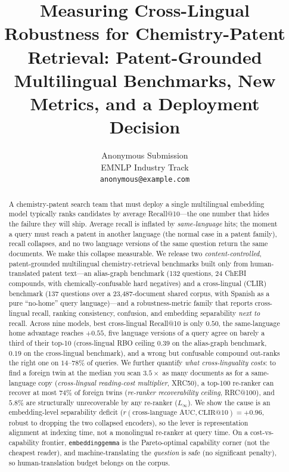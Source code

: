 \documentclass[11pt]{article}
\title{Measuring Cross-Lingual Robustness for Chemistry-Patent Retrieval:
Patent-Grounded Multilingual Benchmarks, New Metrics, and a Deployment Decision}
\author{Anonymous Submission \\
  EMNLP Industry Track \\
  \texttt{anonymous@example.com}}
\begin{document}
\maketitle

\begin{abstract}
A chemistry-patent search team that must deploy a single multilingual
embedding model typically ranks candidates by average Recall@10---the one
number that hides the failure they will ship. Average recall is inflated by
\emph{same-language} hits; the moment a query must reach a patent in another
language (the normal case in a patent family), recall collapses, and no two
language versions of the same question return the same documents. We make this
collapse measurable. We release two \emph{content-controlled},
patent-grounded multilingual chemistry-retrieval benchmarks built only from
human-translated patent text---an alias-graph benchmark (132 questions, 24
ChEBI compounds, with chemically-confusable hard negatives) and a cross-lingual
(CLIR) benchmark (137 questions over a 23{,}487-document shared corpus, with
Spanish as a pure ``no-home'' query language)---and a robustness-metric family
that reports cross-lingual recall, ranking consistency, confusion, and
embedding separability \emph{next to} recall. Across nine models, best
cross-lingual Recall@10 is only $0.50$, the same-language home advantage
reaches $+0.55$, five language versions of a query agree on barely a third of
their top-10 (cross-lingual RBO ceiling $0.39$ on the alias-graph benchmark,
$0.19$ on the cross-lingual benchmark), and a wrong but confusable compound
out-ranks the right one on $14$--$78\%$ of queries. We further quantify
\emph{what cross-linguality costs}: to find a foreign twin at the median you
scan $3.5\times$ as many documents as for a same-language copy
(\emph{cross-lingual reading-cost multiplier}, XRC50), a top-100 re-ranker
can recover at most $74\%$ of foreign twins (\emph{re-ranker recoverability
ceiling}, RRC@100), and $5.8\%$ are structurally unrecoverable by any re-ranker
($L_\infty$). We show the cause is an embedding-level separability
deficit ($r(\text{cross-language AUC},\text{CLIR@10})=+0.96$, robust to dropping
the two collapsed encoders), so the lever is representation alignment at
indexing time, not a monolingual re-ranker at query time. On a cost-vs-capability
frontier, \texttt{embeddinggemma} is the Pareto-optimal capability corner (not the
cheapest reader), and machine-translating the \emph{question} is safe (no
significant penalty), so human-translation budget belongs on the corpus.
\end{abstract}
\end{document}
